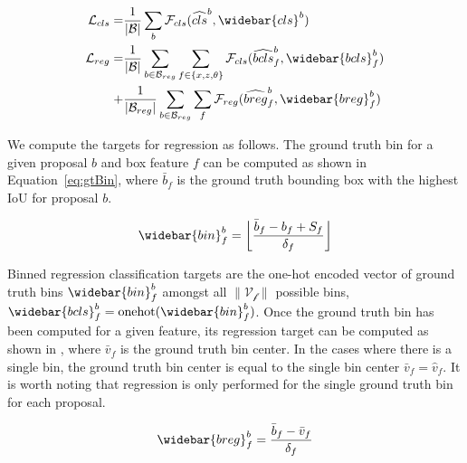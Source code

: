 \documentclass[10pt,twocolumn,letterpaper]{article}
\begin{document}
\begin{equation}
    \begin{split}
        \mathcal{L}_{cls} = &\frac{1}{\vert\mathcal{B}\vert} \sum_b{\mathcal{F}_{cls}(\widehat{cls}^b, \widebar{cls}^b)}  \\
        \mathcal{L}_{reg} = &\frac{1}{\vert\mathcal{B}\vert} \sum_{b \in \mathcal{B}_{reg}} \sum_{f \in \{x,z,\theta\}}\mathcal{F}_{cls}(\widehat{bcls}^b_f, \widebar{bcls}^b_f)\\ 
        + &\frac{1}{\vert\mathcal{B}_{reg}\vert} \sum_{b \in \mathcal{B}_{reg}} \sum_f\mathcal{F}_{reg}(\widehat{breg}^b_f, \widebar{breg}^b_f) 
    \end{split}
    \label{eq:Losses}
\end{equation}

We compute the targets for regression as follows.
The ground truth bin for a given proposal $b$ and box feature $f$ can be computed as shown in Equation~\eqref{eq:gtBin}, where $\bar{b}_f$ is the ground truth bounding box with the highest IoU for proposal $b$.


\begin{equation}
    \begin{split}
    \widebar{bin}^b_f &= \floor*{\frac{\bar{b}_f - b_f + S_f}{\delta_f}} \\
    \end{split}
    \label{eq:gtBin}
\end{equation}

Binned regression classification targets are the one-hot encoded vector of ground truth bins $\widebar{bin}^b_f$ amongst all $\| \mathcal{V_f} \|$ possible bins, \ie $\widebar{bcls}^b_f = \text{onehot}(\widebar{bin}^b_f)$.
Once the ground truth bin has been computed for a given feature, its regression target can be computed as shown in , where $\bar{v}_f$ is the ground truth bin center.
In the cases where there is a single bin, the ground truth bin center is equal to the single bin center \ie $\bar{v}_f = \hat{v}_f$.
It is worth noting that regression is only performed for the single ground truth bin for each proposal.

\begin{equation}
    \begin{split}
    \widebar{breg}^b_f &= \frac{\bar{b}_f - \bar{v}_f}{\delta_f} \\
    \end{split}
    \label{eq:regressionTargets}
\end{equation}
\end{document}
